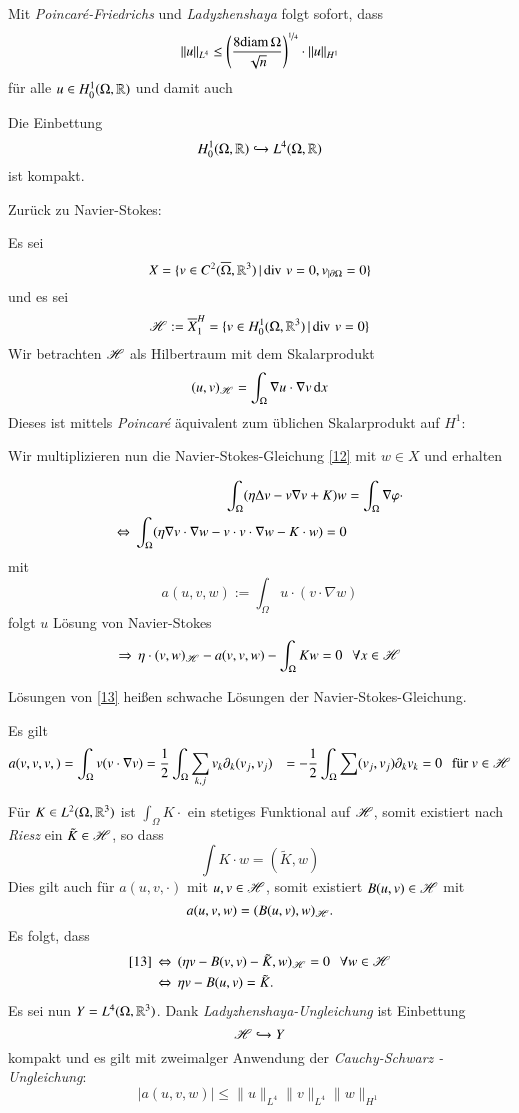     Mit \textit{Poincaré-Friedrichs} und \textit{Ladyzhenshaya} folgt sofort, dass
    \[
    \|u\|_{L^4}\leq \left( \frac{8\mathrm{diam}\, \Omega}{\sqrt{n}} \right)^{\nicefrac14} \cdot\|u\|_{H^1}
    \]
    für alle $u\in H_0^1(\Omega,\mathbb{R})$ und damit auch

    \begin{cor}\label{004}
    Die Einbettung
    \[
H_0^1(\Omega,\mathbb{R}) \hookrightarrow L^4(\Omega,\mathbb{R})
    \]
    ist kompakt.
    \end{cor}

    Zurück zu Navier-Stokes:

    Es sei 
    \[
    X=\{v\in C^2(\overline\Omega,\mathbb{R}^3) \, | \, \mathrm{div}\, \, v=0, v_{|\partial\Omega}=0\}
    \]
    und es sei
    \[
    \mathscr H:=\overline{X}^H_1 = \{v\in H_0^1(\Omega,\mathbb{R}^3) \, | \, \mathrm{div}\, \, v =0\}
    \]
    Wir betrachten $\mathscr H$ als Hilbertraum mit dem Skalarprodukt
    \[
    (u,v)_{\mathscr H}= \int_\Omega\nabla u \cdot \nabla v \, \mathrm{d} x
\]
Dieses ist mittels \textit{Poincaré} äquivalent zum üblichen Skalarprodukt auf $H^1$:

Wir multiplizieren nun die Navier-Stokes-Gleichung \ref{12} mit $w\in X$ und erhalten

\begin{align*}
    \int_\Omega (\eta\Delta v - v\nabla v + K)w &= \int_\Omega \nabla \varphi \cdot \\
    \Leftrightarrow \, \int_\Omega (\eta \nabla v \cdot \nabla w - v\cdot v \cdot \nabla w- K\cdot w)=0 
\end{align*}
mit
\[
    a(u,v,w):= \int_\Omega u\cdot(v\cdot \nabla w)
\]
folgt $u$ Lösung von Navier-Stokes
\begin{align}\label{13}
    \Rightarrow \, \eta\cdot (v,w)_{\mathscr H} - a(v,v,w)- \int_\Omega Kw =0 \hspace{.25cm} \forall x \in \mathscr H
\end{align}

Lösungen von \ref{13} heißen schwache Lösungen der Navier-Stokes-Gleichung.

\begin{remark}
    Es gilt
    \begin{align*}
        a(v,v,v,)&=\int_\Omega v(v\cdot \nabla v)=\frac12 \int_\Omega\sum_{k,j} v_k\partial_k(v_j,v_j)
        &=-\frac12 \int_\Omega\sum(v_j,v_j)\partial_kv_k=0 \hspace{.25cm} \text{für } v\in \mathscr H 
    \end{align*}
\end{remark}
Für $K\in L^2 (\Omega,\mathbb{R}^3)$ ist $\int_\Omega K \cdot$ ein stetiges Funktional auf $\mathscr H$, somit
existiert nach \textit{Riesz} ein $\tilde K \in \mathscr H$, so dass
\[
    \int K\cdot w= (\tilde K, w) 
\]
Dies gilt auch für $a(u,v,\cdot)$ mit $u,v\in \mathscr H$, somit existiert $B(u,v) \in \mathscr H$ mit
\[
    a(u,v,w)=(B(u,v),w)_{\mathscr H}.
\]
Es folgt, dass
\begin{align*}
    \ref{13} \, &\Leftrightarrow \, (\eta v - B(v,v)- \tilde K, w)_{\mathscr H}=0 \hspace{.25cm} \forall w\in \mathscr H\\
        &\Leftrightarrow \, \eta v - B(u,v)=\tilde K.
\end{align*}
Es sei nun $Y=L^4(\Omega,\mathbb{R}^3)$. Dank \textit{Ladyzhenshaya-Ungleichung} ist Einbettung
\[
    \mathscr H \hookrightarrow Y
\]
kompakt und es gilt mit zweimalger Anwendung der \textit{Cauchy-Schwarz - Ungleichung}:
\[
    |a(u,v,w)|\leq\|u\|_{L^4}\|v\|_{L^4}\|w\|_{H^1}
\]



